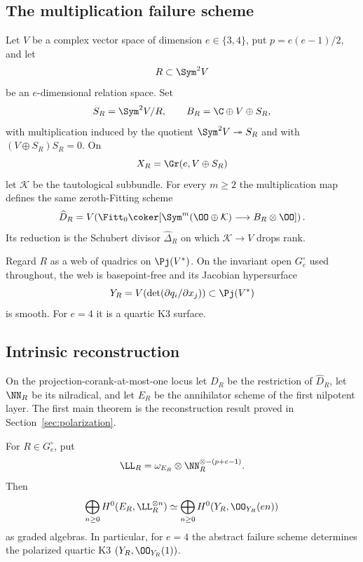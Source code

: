 \subsection{The multiplication failure scheme}

Let \(V\) be a complex vector space of dimension
\(e\in\{3,4\}\), put \(p=e(e-1)/2\), and let
\[
 R\subset\Sym^2V
\]
be an \(e\)-dimensional relation space.  Set
\[
 S_R=\Sym^2V/R,\qquad
 B_R=\C\oplus V\oplus S_R,
\]
with multiplication induced by the quotient
\(\Sym^2V\twoheadrightarrow S_R\) and with
\((V\oplus S_R)S_R=0\).  On
\[
 X_R=\Gr(e,V\oplus S_R)
\]
let \(\mathcal K\) be the tautological subbundle.  For every
\(m\ge2\) the multiplication map defines the same zeroth-Fitting
scheme
\begin{equation}\label{eq:failure-intro}
 \widehat D_R=
 V\!\left(
 \Fitt_0\coker[
 \Sym^m(\OO\oplus\mathcal K)\longrightarrow
 B_R\otimes\OO]\right).
\end{equation}
Its reduction is the Schubert divisor
\(\widehat\Delta_R\) on which \(\mathcal K\to V\) drops rank.

Regard \(R\) as a web of quadrics on \(\Pj(V^*)\).  On the
invariant open \(G_e^\circ\) used throughout, the web is
basepoint-free and its Jacobian hypersurface
\begin{equation}\label{eq:Y-intro}
 Y_R=V\!\left(\det(\partial q_i/\partial x_j)\right)
 \subset\Pj(V^*)
\end{equation}
is smooth.  For \(e=4\) it is a quartic K3 surface.

\subsection{Intrinsic reconstruction}

On the projection-corank-at-most-one locus let \(D_R\) be the
restriction of \(\widehat D_R\), let \(\NN_R\) be its
nilradical, and let \(E_R\) be the annihilator scheme of the first
nilpotent layer.  The first main theorem is the reconstruction result
proved in Section~\ref{sec:polarization}.

\begin{theorem}
\label{thm:main-reconstruction}
For \(R\in G_e^\circ\), put
\[
 \LL_R=\omega_{E_R}\otimes
 \NN_R^{\otimes-(p+e-1)}.
\]
Then
\[
 \bigoplus_{n\ge0}H^0(E_R,\LL_R^{\otimes n})
 \simeq
 \bigoplus_{n\ge0}H^0(Y_R,\OO_{Y_R}(en))
\]
as graded algebras.  In particular, for \(e=4\) the abstract
failure scheme determines the polarized quartic K3
\((Y_R,\OO_{Y_R}(1))\).
\end{theorem}

